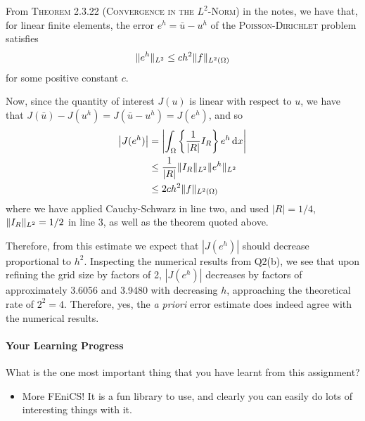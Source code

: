 \begin{solution}

From \textsc{Theorem 2.3.22 (Convergence in the $L^2$-Norm)} in the notes, we have that, for linear finite elements, the error $e^h = \bar{u} - u^h$ of the \textsc{Poisson-Dirichlet} problem satisfies
$$ \lVert e^h \rVert_{L^2} \leq c h^2 \lVert f \rVert_{L^2(\Omega)} $$
for some positive constant $c$.

Now, since the quantity of interest $J(u)$ is linear with respect to $u$, we have that $J(\bar{u}) - J(u^h) = J(\bar{u} - u^h) = J(e^h)$, and so
\begin{align*}
\abs{ J(e^h) } &= \abs{ \int_\Omega \left\{ \frac{1}{|R|} I_R \right\} e^h \operatorname{d}\!{x} } \\
&\leq \frac{1}{|R|} \lVert I_R \rVert_{L^2} \lVert e^h \rVert_{L^2} \\
&\leq 2 c h^2 \lVert f \rVert_{L^2(\Omega)}
\end{align*}
where we have applied Cauchy-Schwarz in line two, and used $|R| = 1/4$, $\lVert I_R \rVert_{L^2} = 1/2$ in line 3, as well as the theorem quoted above.

Therefore, from this estimate we expect that $|J(e^h)|$ should decrease proportional to $h^2$. Inspecting the numerical results from Q2(b), we see that upon refining the grid size by factors of 2, $|J(e^h)|$ decreases by factors of approximately 3.6056 and 3.9480 with decreasing $h$, approaching the theoretical rate of $2^2=4$. Therefore, yes, the \textit{a priori} error estimate does indeed agree with the numerical results.

\end{solution}

\vfill
\newpage

\paragraph*{Your Learning Progress}%

What is the one most important thing that you have learnt from this assignment?

\vspace*{3mm}

\begin{itemize}
\item More \textsf{FEniCS}! It is a fun library to use, and clearly you can easily do lots of interesting things with it.
\end{itemize}

\vspace*{5mm}

